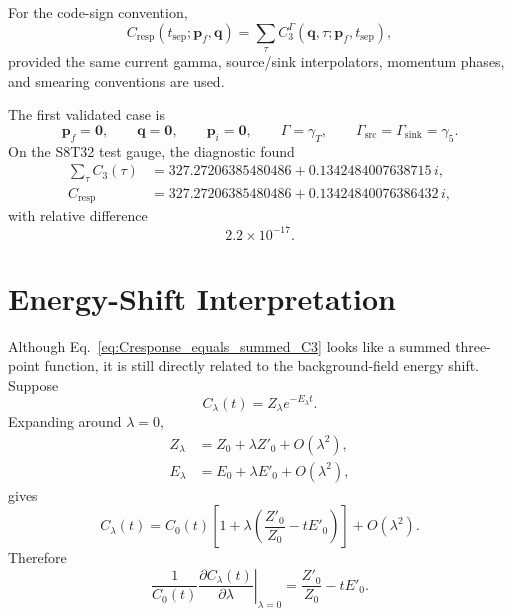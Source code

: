 \documentclass[11pt,a4paper]{article}
\newcommand{\gsrc}{\Gamma_{\mathrm{src}}}
\newcommand{\gsink}{\Gamma_{\mathrm{sink}}}
\newcommand{\Cthree}{C_3}
\newcommand{\Cresp}{C_{\mathrm{resp}}}
\begin{document}
For the code-sign convention,
\begin{equation}
  \Cresp(t_{\mathrm{sep}};\mathbf p_f,\mathbf q)
  =
  \sum_\tau
  \Cthree^\Gamma(\mathbf q,\tau;\mathbf p_f,t_{\mathrm{sep}}),
\label{eq:Cresponse_equals_summed_C3}
\end{equation}
provided the same current gamma, source/sink interpolators, momentum phases, and
smearing conventions are used.

The first validated case is
\begin{equation}
  \mathbf p_f=\mathbf 0,\qquad
  \mathbf q=\mathbf 0,\qquad
  \mathbf p_i=\mathbf 0,\qquad
  \Gamma=\gamma_T,\qquad
  \gsrc=\gsink=\gamma_5.
\end{equation}
On the S8T32 test gauge, the diagnostic found
\begin{align}
  \sum_\tau C_3(\tau)
    &= 327.27206385480486 + 0.1342484007638715\,i,\\
  C_{\mathrm{resp}}
    &= 327.27206385480486 + 0.13424840076386432\,i,
\end{align}
with relative difference
\begin{equation}
  2.2\times 10^{-17}.
\end{equation}

\section{Energy-Shift Interpretation}

Although Eq.~\eqref{eq:Cresponse_equals_summed_C3} looks like a summed
three-point function, it is still directly related to the background-field
energy shift.  Suppose
\begin{equation}
  C_\lambda(t)
  =
  Z_\lambda e^{-E_\lambda t}.
\end{equation}
Expanding around \(\lambda=0\),
\begin{align}
  Z_\lambda &= Z_0 + \lambda Z'_0 + O(\lambda^2),\\
  E_\lambda &= E_0 + \lambda E'_0 + O(\lambda^2),
\end{align}
gives
\begin{equation}
  C_\lambda(t)
  =
  C_0(t)
  \left[
    1+\lambda
    \left(
      \frac{Z'_0}{Z_0} - t E'_0
    \right)
  \right]
  + O(\lambda^2).
\end{equation}
Therefore
\begin{equation}
  \frac{1}{C_0(t)}
  \left.
  \frac{\partial C_\lambda(t)}{\partial\lambda}
  \right|_{\lambda=0}
  =
  \frac{Z'_0}{Z_0} - t E'_0.
\label{eq:response_ratio_slope}
\end{equation}
\end{document}

